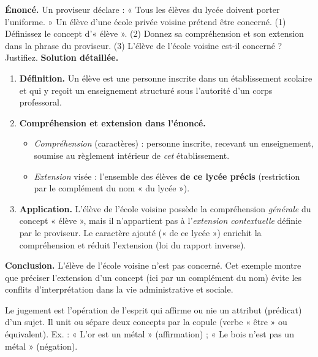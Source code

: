 \documentclass[11pt]{article}
\newcommand{\cle}[1]{{\popxbold\color{popdark}#1}}
\newcounter{popsec}
\newcounter{popsub}
\newcommand{\courssub}[1]{%
  \stepcounter{popsub}%
  \par\vspace{9pt}\noindent{\popxbold\fontsize{11.5}{13}\selectfont\color{popink}{\color{poporange}\thepopsec.\thepopsub}\hspace{6pt}#1}\par\nopagebreak\vspace{4pt}
}
\begin{document}
\begin{exoresolu}
\textbf{Énoncé.} Un proviseur déclare : « Tous les élèves du lycée doivent porter l'uniforme. » Un élève d'une école privée voisine prétend être concerné. (1) Définissez le concept d'« élève ». (2) Donnez sa compréhension et son extension dans la phrase du proviseur. (3) L'élève de l'école voisine est-il concerné ? Justifiez.
\tcblower
\textbf{Solution détaillée.}
\begin{enumerate}
\item \textbf{Définition.} Un élève est une personne inscrite dans un établissement scolaire et qui y reçoit un enseignement structuré sous l'autorité d'un corps professoral.
\item \textbf{Compréhension et extension dans l'énoncé.}
\begin{itemize}
\item \emph{Compréhension} (caractères) : personne inscrite, recevant un enseignement, soumise au règlement intérieur de \emph{cet} établissement.
\item \emph{Extension} visée : l'ensemble des élèves \textbf{de ce lycée précis} (restriction par le complément du nom « du lycée »).
\end{itemize}
\item \textbf{Application.} L'élève de l'école voisine possède la compréhension \emph{générale} du concept « élève », mais il n'appartient pas à l'\emph{extension contextuelle} définie par le proviseur. Le caractère ajouté (« de ce lycée ») enrichit la compréhension et réduit l'extension (loi du rapport inverse).
\end{enumerate}
\textbf{Conclusion.} L'élève de l'école voisine n'est pas concerné. Cet exemple montre que préciser l'extension d'un concept (ici par un complément du nom) évite les conflits d'interprétation dans la vie administrative et sociale.
\end{exoresolu}

\courssub{Le jugement}

\begin{definition}[Jugement]
Le \cle{jugement} est l'opération de l'esprit qui affirme ou nie un attribut (prédicat) d'un sujet. Il unit ou sépare deux concepts par la copule (verbe « être » ou équivalent). Ex. : « L'or est un métal » (affirmation) ; « Le bois n'est pas un métal » (négation).
\end{definition}
\end{document}
